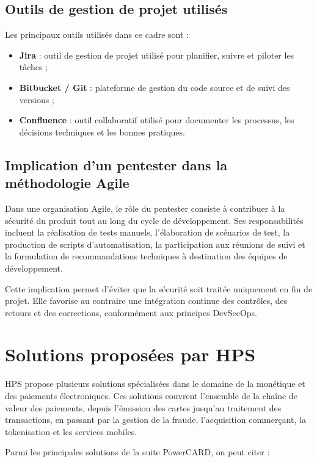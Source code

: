 \subsection{Outils de gestion de projet utilisés}

Les principaux outils utilisés dans ce cadre sont :

\begin{itemize}
    \item \textbf{Jira} : outil de gestion de projet utilisé pour planifier, suivre et piloter les tâches ;
    \item \textbf{Bitbucket / Git} : plateforme de gestion du code source et de suivi des versions ;
    \item \textbf{Confluence} : outil collaboratif utilisé pour documenter les processus, les décisions techniques et les bonnes pratiques.
\end{itemize}

\subsection{Implication d'un pentester dans la méthodologie Agile}

Dans une organisation Agile, le rôle du pentester consiste à contribuer à la sécurité du produit tout au long du cycle de développement. Ses responsabilités incluent la réalisation de tests manuels, l'élaboration de scénarios de test, la production de scripts d'automatisation, la participation aux réunions de suivi et la formulation de recommandations techniques à destination des équipes de développement.

Cette implication permet d'éviter que la sécurité soit traitée uniquement en fin de projet. Elle favorise au contraire une intégration continue des contrôles, des retours et des corrections, conformément aux principes DevSecOps.

\section{Solutions proposées par HPS}

HPS propose plusieurs solutions spécialisées dans le domaine de la monétique et des paiements électroniques. Ces solutions couvrent l'ensemble de la chaîne de valeur des paiements, depuis l'émission des cartes jusqu'au traitement des transactions, en passant par la gestion de la fraude, l'acquisition commerçant, la tokenisation et les services mobiles.

Parmi les principales solutions de la suite PowerCARD, on peut citer :

